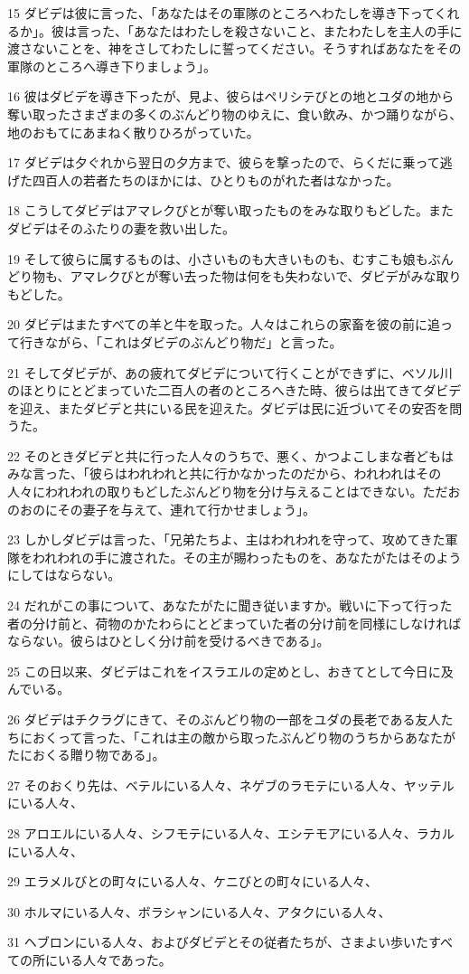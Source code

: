 \par 15 ダビデは彼に言った、「あなたはその軍隊のところへわたしを導き下ってくれるか」。彼は言った、「あなたはわたしを殺さないこと、またわたしを主人の手に渡さないことを、神をさしてわたしに誓ってください。そうすればあなたをその軍隊のところへ導き下りましょう」。
\par 16 彼はダビデを導き下ったが、見よ、彼らはペリシテびとの地とユダの地から奪い取ったさまざまの多くのぶんどり物のゆえに、食い飲み、かつ踊りながら、地のおもてにあまねく散りひろがっていた。
\par 17 ダビデは夕ぐれから翌日の夕方まで、彼らを撃ったので、らくだに乗って逃げた四百人の若者たちのほかには、ひとりものがれた者はなかった。
\par 18 こうしてダビデはアマレクびとが奪い取ったものをみな取りもどした。またダビデはそのふたりの妻を救い出した。
\par 19 そして彼らに属するものは、小さいものも大きいものも、むすこも娘もぶんどり物も、アマレクびとが奪い去った物は何をも失わないで、ダビデがみな取りもどした。
\par 20 ダビデはまたすべての羊と牛を取った。人々はこれらの家畜を彼の前に追って行きながら、「これはダビデのぶんどり物だ」と言った。
\par 21 そしてダビデが、あの疲れてダビデについて行くことができずに、ベソル川のほとりにとどまっていた二百人の者のところへきた時、彼らは出てきてダビデを迎え、またダビデと共にいる民を迎えた。ダビデは民に近づいてその安否を問うた。
\par 22 そのときダビデと共に行った人々のうちで、悪く、かつよこしまな者どもはみな言った、「彼らはわれわれと共に行かなかったのだから、われわれはその人々にわれわれの取りもどしたぶんどり物を分け与えることはできない。ただおのおのにその妻子を与えて、連れて行かせましょう」。
\par 23 しかしダビデは言った、「兄弟たちよ、主はわれわれを守って、攻めてきた軍隊をわれわれの手に渡された。その主が賜わったものを、あなたがたはそのようにしてはならない。
\par 24 だれがこの事について、あなたがたに聞き従いますか。戦いに下って行った者の分け前と、荷物のかたわらにとどまっていた者の分け前を同様にしなければならない。彼らはひとしく分け前を受けるべきである」。
\par 25 この日以来、ダビデはこれをイスラエルの定めとし、おきてとして今日に及んでいる。
\par 26 ダビデはチクラグにきて、そのぶんどり物の一部をユダの長老である友人たちにおくって言った、「これは主の敵から取ったぶんどり物のうちからあなたがたにおくる贈り物である」。
\par 27 そのおくり先は、ベテルにいる人々、ネゲブのラモテにいる人々、ヤッテルにいる人々、
\par 28 アロエルにいる人々、シフモテにいる人々、エシテモアにいる人々、ラカルにいる人々、
\par 29 エラメルびとの町々にいる人々、ケニびとの町々にいる人々、
\par 30 ホルマにいる人々、ボラシャンにいる人々、アタクにいる人々、
\par 31 ヘブロンにいる人々、およびダビデとその従者たちが、さまよい歩いたすべての所にいる人々であった。

